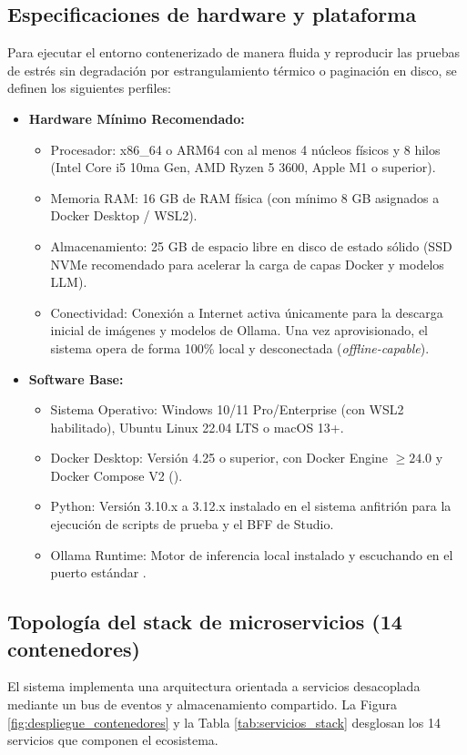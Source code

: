 \documentclass[11pt,a4paper]{article}
\newcommand{\code}[1]{\texttt{\detokenize{#1}}}
\begin{document}
\subsection{Especificaciones de hardware y plataforma}
Para ejecutar el entorno contenerizado de manera fluida y reproducir las pruebas de estrés sin degradación por estrangulamiento térmico o paginación en disco, se definen los siguientes perfiles:

\begin{itemize}[leftmargin=*]
    \item \textbf{Hardware Mínimo Recomendado:}
    \begin{itemize}
        \item Procesador: x86\_64 o ARM64 con al menos 4 núcleos físicos y 8 hilos (Intel Core i5 10ma Gen, AMD Ryzen 5 3600, Apple M1 o superior).
        \item Memoria RAM: 16 GB de RAM física (con mínimo 8 GB asignados a Docker Desktop / WSL2).
        \item Almacenamiento: 25 GB de espacio libre en disco de estado sólido (SSD NVMe recomendado para acelerar la carga de capas Docker y modelos LLM).
        \item Conectividad: Conexión a Internet activa únicamente para la descarga inicial de imágenes y modelos de Ollama. Una vez aprovisionado, el sistema opera de forma 100\% local y desconectada (\textit{offline-capable}).
    \end{itemize}
    \item \textbf{Software Base:}
    \begin{itemize}
        \item Sistema Operativo: Windows 10/11 Pro/Enterprise (con WSL2 habilitado), Ubuntu Linux 22.04 LTS o macOS 13+.
        \item Docker Desktop: Versión 4.25 o superior, con Docker Engine $\ge 24.0$ y Docker Compose V2 (\code{docker compose}).
        \item Python: Versión 3.10.x a 3.12.x instalado en el sistema anfitrión para la ejecución de scripts de prueba y el BFF de Studio.
        \item Ollama Runtime: Motor de inferencia local instalado y escuchando en el puerto estándar \code{11434}.
    \end{itemize}
\end{itemize}

\subsection{Topología del stack de microservicios (14 contenedores)}
El sistema implementa una arquitectura orientada a servicios desacoplada mediante un bus de eventos y almacenamiento compartido. La Figura \ref{fig:despliegue_contenedores} y la Tabla \ref{tab:servicios_stack} desglosan los 14 servicios que componen el ecosistema.
\end{document}
